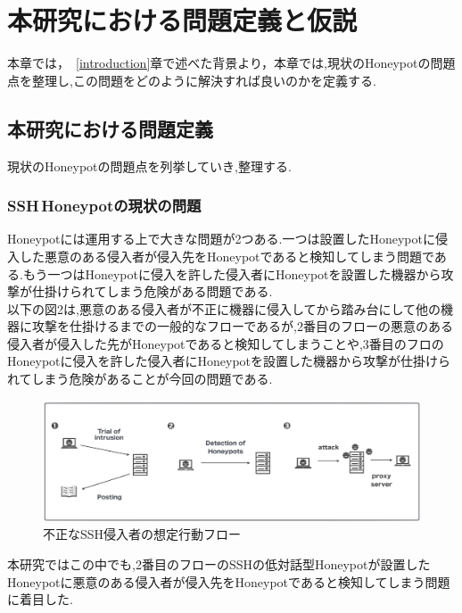\chapter{本研究における問題定義と仮説}
\label{approach}

本章では，~\ref{introduction}章で述べた背景より，本章では,現状のHoneypotの問題点を整理し,この問題をどのように解決すれば良いのかを定義する.

\section{本研究における問題定義}
\label{approach:problem}
現状のHoneypotの問題点を列挙していき,整理する.

\subsection{SSH\,Honeypotの現状の問題}
\label{approach:problemofSshHoneypot}
Honeypotには運用する上で大きな問題が2つある.一つは設置したHoneypotに侵入した悪意のある侵入者が侵入先をHoneypotであると検知してしまう問題である.もう一つはHoneypotに侵入を許した侵入者にHoneypotを設置した機器から攻撃が仕掛けられてしまう危険がある問題である.\\
以下の図2は,悪意のある侵入者が不正に機器に侵入してから踏み台にして他の機器に攻撃を仕掛けるまでの一般的なフローであるが,2番目のフローの悪意のある侵入者が侵入した先がHoneypotであると検知してしまうことや,3番目のフロのHoneypotに侵入を許した侵入者にHoneypotを設置した機器から攻撃が仕掛けられてしまう危険があることが今回の問題である.

\vspace{10mm}
\begin{figure}[H]
    \centering
    \includegraphics[width=1.0\textwidth]{figures/nagare.png}
    \caption{不正なSSH侵入者の想定行動フロー}
    \label{fig:evo}
\end{figure}

本研究ではこの中でも,2番目のフローのSSHの低対話型Honeypotが設置したHoneypotに悪意のある侵入者が侵入先をHoneypotであると検知してしまう問題に着目した.

